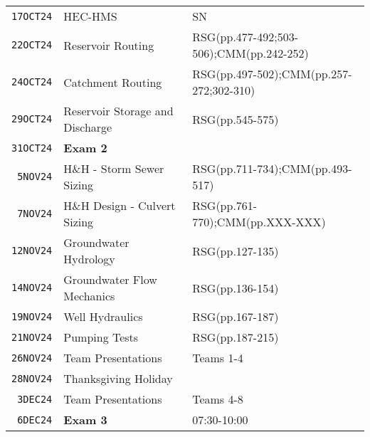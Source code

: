 \documentclass[12pt]{article}
\begin{document}
\begin{table}[ht!]
\begin{tabular}{p{0.5in}p{3.0in}p{3.0in}}
\texttt{17OCT24} & HEC-HMS  & SN \\ %
\texttt{22OCT24} & Reservoir Routing &RSG(pp.477-492;503-506);CMM(pp.242-252)  \\ %
\texttt{24OCT24} & Catchment Routing &RSG(pp.497-502);CMM(pp.257-272;302-310)\\ %
\texttt{29OCT24} & Reservoir Storage and Discharge & RSG(pp.545-575)\\ %
\texttt{31OCT24} & \textbf{Exam 2} & \\ %
\texttt{~5NOV24} & H\&H - Storm Sewer Sizing &RSG(pp.711-734);CMM(pp.493-517)  \\ %
\texttt{~7NOV24} & H\&H Design - Culvert Sizing & RSG(pp.761-770);CMM(pp.XXX-XXX)  \\ %
\texttt{12NOV24} & Groundwater Hydrology & RSG(pp.127-135)  \\ %
\texttt{14NOV24} & Groundwater Flow Mechanics & RSG(pp.136-154) \\ %
\texttt{19NOV24} & Well Hydraulics & RSG(pp.167-187) \\ %
\texttt{21NOV24} & Pumping Tests & RSG(pp.187-215) \\ %
\texttt{26NOV24} & Team Presentations &  Teams 1-4\\ %
\texttt{28NOV24} & Thanksgiving Holiday &    \\ %
\texttt{~3DEC24} & Team Presentations & Teams 4-8 \\ %
\texttt{~6DEC24} & \textbf{Exam 3} & 07:30-10:00 \\ %
\hline
   \end{tabular}
   \label{tab:fall2013schedule}
\end{table}


\clearpage
\end{document}
